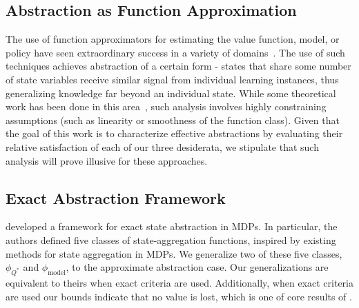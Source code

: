 \subsection{Abstraction as Function Approximation}

The use of function approximators for estimating the value function, model, or policy have seen extraordinary success in a variety of domains~\cite{mnih2015human,sutton1999policy,baird1995residual,stadie2015incentivizing,ormoneit2002kernel}. The use of such techniques achieves abstraction of a certain form - states that share some number of state variables receive similar signal from individual learning instances, thus generalizing knowledge far beyond an individual state. While some theoretical work has been done in this area~\cite{schoknecht2002optimality,thrun1993issues,parr2008analysis}, such analysis involves highly constraining assumptions (such as linearity or smoothness of the function class). Given that the goal of this work is to characterize effective abstractions by evaluating their relative satisfaction of each of our three desiderata, we stipulate that such analysis will prove illusive for these approaches.


\subsection{Exact Abstraction Framework}

\citet{li2006towards} developed a framework for exact state abstraction in \acp{MDP}. In particular, the authors defined five classes of state-aggregation functions, inspired by existing methods for state aggregation in \acp{MDP}. We generalize two of these five classes, $\phi_{Q^*}$ and $\phi_{\text{model}}$, to the approximate abstraction case. Our generalizations are equivalent to theirs when exact criteria are used. Additionally, when exact criteria are used our bounds indicate that no value is lost, which is one of core results of \citet{li2006towards}.

